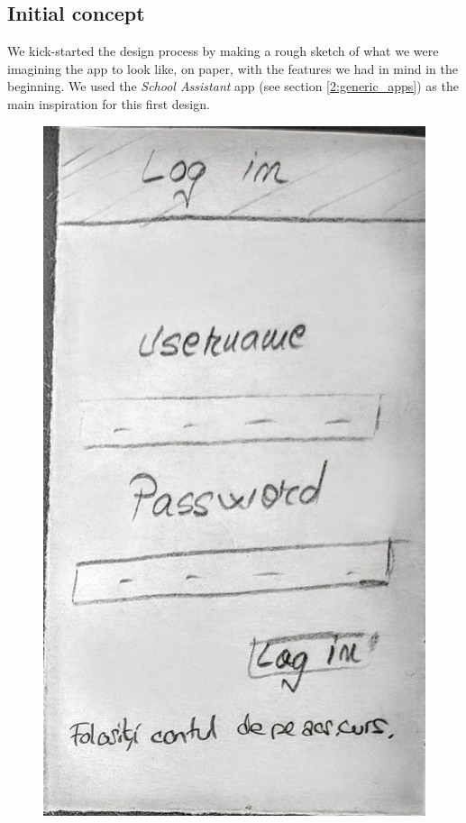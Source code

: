 \subsection{Initial concept} \label{4:paper_concept}

We kick-started the design process by making a rough sketch of what we were imagining the app to look like, on paper, with the features we had in mind in the beginning. We used the \textit{School Assistant} app (see section \ref{2:generic_apps}) as the main inspiration for this first design.

\begin{figure}[ht]
    \centering
         \includegraphics[height=0.279\textheight]{figures/app/paper/login.jpg}

\end{figure}

